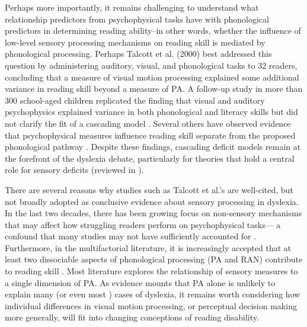 \documentclass[../uwthesis.tex]{subfiles}
\begin{document}
Perhaps more importantly, it remains challenging to understand what relationship predictors from psychophysical tasks have with phonological predictors in determining reading ability--in other words, whether the influence of low-level sensory processing mechanisms on reading skill is mediated by phonological processing. Perhaps Talcott et al. (2000) best addressed this question by administering auditory, visual, and phonological tasks to 32 readers, concluding that a measure of visual motion processing explained some additional variance in reading skill beyond a measure of PA. A follow-up study in more than 300 school-aged children replicated the finding that visual and auditory psychophysics explained variance in both phonological and literacy skills but did not clarify the fit of a cascading model \citep{Talcott2000}. Several others have observed evidence that psychophysical measures influence reading skill separate from the proposed phonological pathway \citep{Snowling2019LongitudinalDyslexia,Stein2001TheDyslexia,White2006}. Despite these findings, cascading deficit models remain at the forefront of the dyslexia debate, particularly for theories that hold a central role for sensory deficits (reviewed in \citep{Goswami2015SensoryResearch}).

There are several reasons why studies such as Talcott et al.’s are well-cited, but not broadly adopted as conclusive evidence about sensory processing in dyslexia. In the last two decades, there has been growing focus on non-sensory mechanisms that may affect how struggling readers perform on psychophysical tasks— a confound that many studies may not have sufficiently accounted for 
\citep{Banai2004,Ramus2012}. Furthermore, in the multifactorial literature, it is increasingly accepted that at least two dissociable aspects of phonological processing (PA and RAN) contribute to reading skill \citep{Pennington2012IndividualModels.,Wolf1999TheDyslexias,Wolf2000Naming-speedHypothesis}. Most literature explores the relationship of sensory measures to a single dimension of PA. As evidence mounts that PA alone is unlikely to explain many (or even most \citep{Pennington2012IndividualModels.}) cases of dyslexia, it remains worth considering how individual differences in visual motion processing, or perceptual decision making more generally, will fit into changing conceptions of reading disability. 
\end{document}
